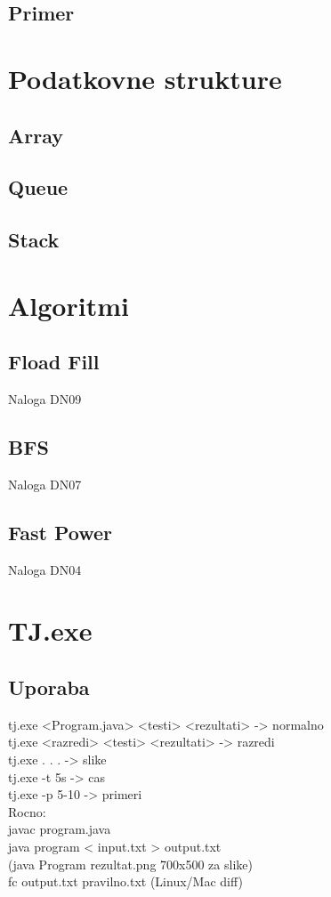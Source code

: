 \documentclass[a4paper,oneside,12pt]{article}
\theoremstyle{definition}
\begin{document}
	\subsection{Primer}

\section{Podatkovne strukture}
	\subsection{Array}
	\subsection{Queue}
	\subsection{Stack}

\section{Algoritmi}
	\subsection{Fload Fill}
		Naloga DN09\\
	\subsection{BFS}
		Naloga DN07\\
	\subsection{Fast Power}
		Naloga DN04\\
\section{TJ.exe}
	\subsection{Uporaba}
		tj.exe <Program.java> <testi> <rezultati> -> normalno\\
		tj.exe <razredi> <testi> <rezultati> -> razredi\\
		tj.exe . . . -> slike\\
		tj.exe -t 5s -> cas\\
		tj.exe -p 5-10 -> primeri\\
		Rocno:\\
		javac program.java\\
		java program < input.txt > output.txt\\
		(java Program rezultat.png 700x500 za slike)\\
		fc output.txt pravilno.txt (Linux/Mac diff)\\
\end{document}
